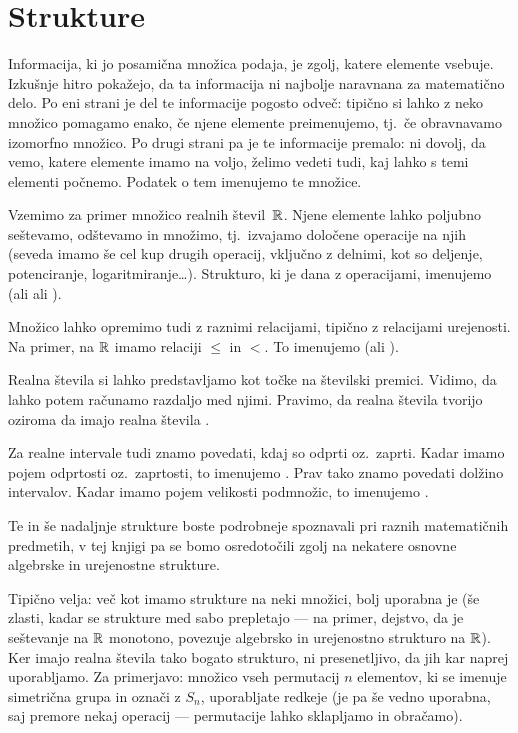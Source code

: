 \chapter{Strukture}


Informacija, ki jo posamična množica podaja, je zgolj, katere elemente vsebuje. Izkušnje hitro pokažejo, da ta informacija ni najbolje naravnana za matematično delo. Po eni strani je del te informacije pogosto odveč: tipično si lahko z neko množico pomagamo enako, če njene elemente preimenujemo, tj.~če obravnavamo izomorfno množico. Po drugi strani pa je te informacije premalo: ni dovolj, da vemo, katere elemente imamo na voljo, želimo vedeti tudi, kaj lahko s temi elementi počnemo. Podatek o tem imenujemo  te množice.

Vzemimo za primer množico realnih števil~$\mathbb{R}$. Njene elemente lahko poljubno seštevamo, odštevamo in množimo, tj.~izvajamo določene operacije na njih (seveda imamo še cel kup drugih operacij, vključno z delnimi, kot so deljenje, potenciranje, logaritmiranje\ldots). Strukturo, ki je dana z operacijami, imenujemo  (ali  ali ).

Množico lahko opremimo tudi z raznimi relacijami, tipično z relacijami urejenosti. Na primer, na $\mathbb{R}$ imamo relaciji $\leq$ in $<$. To imenujemo  (ali ).

Realna števila si lahko predstavljamo kot točke na številski premici. Vidimo, da lahko potem računamo razdaljo med njimi. Pravimo, da realna števila tvorijo  oziroma da imajo realna števila .

Za realne intervale tudi znamo povedati, kdaj so odprti oz.~zaprti. Kadar imamo pojem odprtosti oz.~zaprtosti, to imenujemo . Prav tako znamo povedati dolžino intervalov. Kadar imamo pojem velikosti podmnožic, to imenujemo .

Te in še nadaljnje strukture boste podrobneje spoznavali pri raznih matematičnih predmetih, v tej knjigi pa se bomo osredotočili zgolj na nekatere osnovne algebrske in urejenostne strukture.

Tipično velja: več kot imamo strukture na neki množici, bolj uporabna je (še zlasti, kadar se strukture med sabo prepletajo --- na primer, dejstvo, da je seštevanje na $\mathbb{R}$ monotono, povezuje algebrsko in urejenostno strukturo na $\mathbb{R}$). Ker imajo realna števila tako bogato strukturo, ni presenetljivo, da jih kar naprej uporabljamo. Za primerjavo: množico vseh permutacij $n$ elementov, ki se imenuje simetrična grupa in označi z $S_n$, uporabljate redkeje (je pa še vedno uporabna, saj premore nekaj operacij --- permutacije lahko sklapljamo in obračamo).

